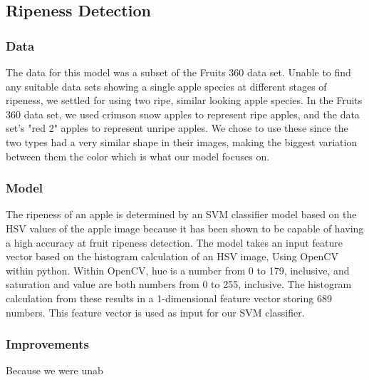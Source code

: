\subsection{Ripeness Detection}
\subsubsection{Data}
The data for this model was a subset of the Fruits 360 data set. %
Unable to find any suitable data sets showing a single apple species at different stages of ripeness, we settled for using two ripe, similar looking apple species.
In the Fruits 360 data set, we used crimson snow apples to represent ripe apples, and the data set's "red 2" apples to represent unripe apples. We  chose to use these since the two types had a very similar shape in their images, making the biggest variation between them the color which is what our model focuses on.

\subsubsection{Model}
The ripeness of an apple is determined by an SVM classifier model based on the HSV values of the apple image because it has been shown to be capable of having a high accuracy at fruit ripeness detection\cite{HSVRipeness}.
The model takes an input feature vector based on the histogram calculation of an HSV image, Using OpenCV within python.
Within OpenCV, hue is a number from 0 to 179, inclusive, and saturation and value are both numbers from 0 to 255, inclusive.
The histogram calculation from these results in a 1-dimensional feature vector storing 689 numbers. 
This feature vector is used as input for our SVM classifier.

\subsubsection{Improvements}
Because we were unab


